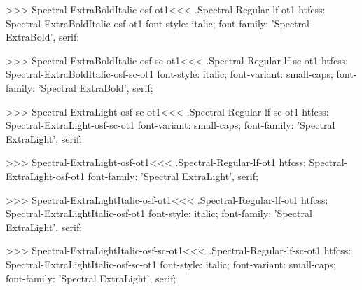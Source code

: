 >>>
\<Spectral-ExtraBoldItalic-osf-ot1\><<<
.Spectral-Regular-lf-ot1
htfcss:  Spectral-ExtraBoldItalic-osf-ot1  font-style: italic; font-family: 'Spectral ExtraBold', serif;

>>>
\<Spectral-ExtraBoldItalic-osf-sc-ot1\><<<
.Spectral-Regular-lf-sc-ot1
htfcss:  Spectral-ExtraBoldItalic-osf-sc-ot1  font-style: italic; font-variant: small-caps; font-family: 'Spectral ExtraBold', serif;

>>>
\<Spectral-ExtraLight-osf-sc-ot1\><<<
.Spectral-Regular-lf-sc-ot1
htfcss:  Spectral-ExtraLight-osf-sc-ot1  font-variant: small-caps; font-family: 'Spectral ExtraLight', serif;

>>>
\<Spectral-ExtraLight-osf-ot1\><<<
.Spectral-Regular-lf-ot1
htfcss:  Spectral-ExtraLight-osf-ot1  font-family: 'Spectral ExtraLight', serif;

>>>
\<Spectral-ExtraLightItalic-osf-ot1\><<<
.Spectral-Regular-lf-ot1
htfcss:  Spectral-ExtraLightItalic-osf-ot1  font-style: italic; font-family: 'Spectral ExtraLight', serif;

>>>
\<Spectral-ExtraLightItalic-osf-sc-ot1\><<<
.Spectral-Regular-lf-sc-ot1
htfcss:  Spectral-ExtraLightItalic-osf-sc-ot1  font-style: italic; font-variant: small-caps; font-family: 'Spectral ExtraLight', serif;

